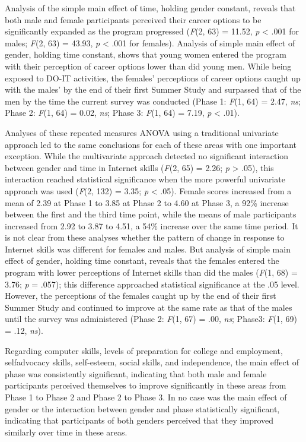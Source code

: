\documentclass[11.5pt]{sig-alternate} %
\begin{document}
\begin{large}
Analysis of the simple main effect of time, holding gender constant, reveals that both male and female participants perceived their career options to be significantly expanded as the program progressed (\textit{F}(2, 63) = 11.52, \textit{p} < .001 for males; \textit{F}(2, 63) = 43.93, \textit{p} < .001 for females). Analysis of simple main effect of gender, holding time constant, shows that young women entered the program with their perception of career options lower than did young men. While being exposed to DO-IT activities, the females’ perceptions of career options caught up with the males’ by the end of their first Summer Study and surpassed that of the men by the time the current survey was conducted (Phase 1: \textit{F}(1, 64) = 2.47, \textit{ns}; Phase 2: \textit{F}(1, 64) = 0.02, \textit{ns}; Phase 3: \textit{F}(1, 64) = 7.19, \textit{p} < .01).  
 
Analyses of these repeated measures ANOVA using a traditional univariate approach led to the same conclusions for each of these areas with one important exception. While the multivariate approach detected no significant interaction between gender and time in Internet skills (\textit{F}(2, 65) = 2.26; \textit{p} > .05), this interaction reached statistical significance when the more powerful univariate approach was used (\textit{F}(2, 132) = 3.35; \textit{p} < .05). Female scores increased from a mean of 2.39 at Phase 1 to 3.85 at Phase 2 to 4.60 at Phase 3, a 92\% increase between the first and the third time point, while the means of male participants increased from 2.92 to 3.87 to 4.51, a 54\% increase over the same time period. It is not clear from these analyses whether the pattern of change in response to Internet skills was different for females and males. But analysis of simple main effect of gender, holding time constant, reveals that the females entered the program with lower perceptions of Internet skills than did the males (\textit{F}(1, 68) = 3.76; \textit{p} = .057); this difference approached statistical significance at the .05 level. However, the perceptions of the females caught up by the end of their first Summer Study and continued to improve at the same rate as that of the males until the survey was administered (Phase 2: \textit{F}(1, 67) = .00, \textit{ns}; Phase3: \textit{F}(1, 69) = .12, \textit{ns}). 
 
Regarding computer skills, levels of preparation for college and employment, selfadvocacy skills, self-esteem, social skills, and independence, the main effect of phase was consistently significant, indicating that both male and female participants perceived themselves to improve significantly in these areas from Phase 1 to Phase 2 and Phase 2 to Phase 3. In no case was the main effect of gender or the interaction between gender and phase statistically significant, indicating that participants of both genders perceived that they improved similarly over time in these areas. 
 

\end{large}
\end{document}

